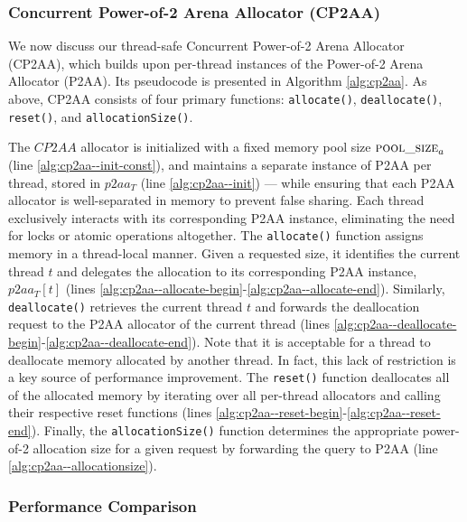 \subsubsection{Concurrent Power-of-2 Arena Allocator (CP2AA)}
\label{sec:cp2aa}

We now discuss our thread-safe Concurrent Power-of-2 Arena Allocator (CP2AA), which builds upon per-thread instances of the Power-of-2 Arena Allocator (P2AA). Its pseudocode is presented in Algorithm \ref{alg:cp2aa}. As above, CP2AA consists of four primary functions: \texttt{allocate()}, \texttt{deallocate()}, \texttt{reset()}, and \texttt{allocationSize()}.



The $CP2AA$ allocator is initialized with a fixed memory pool size $\textsc{pool\_size}_a$ (line \ref{alg:cp2aa--init-const}), and maintains a separate instance of P2AA per thread, stored in $p2aa_T$ (line \ref{alg:cp2aa--init}) --- while ensuring that each P2AA allocator is well-separated in memory to prevent false sharing. Each thread exclusively interacts with its corresponding P2AA instance, eliminating the need for locks or atomic operations altogether. The \texttt{allocate()} function assigns memory in a thread-local manner. Given a requested size, it identifies the current thread $t$ and delegates the allocation to its corresponding P2AA instance, $p2aa_T[t]$ (lines \ref{alg:cp2aa--allocate-begin}-\ref{alg:cp2aa--allocate-end}). Similarly, \texttt{deallocate()} retrieves the current thread $t$ and forwards the deallocation request to the P2AA allocator of the current thread (lines \ref{alg:cp2aa--deallocate-begin}-\ref{alg:cp2aa--deallocate-end}). Note that it is acceptable for a thread to deallocate memory allocated by another thread. In fact, this lack of restriction is a key source of performance improvement. The \texttt{reset()} function deallocates all of the allocated memory by iterating over all per-thread allocators and calling their respective reset functions (lines \ref{alg:cp2aa--reset-begin}-\ref{alg:cp2aa--reset-end}). Finally, the \texttt{allocationSize()} function determines the appropriate power-of-2 allocation size for a given request by forwarding the query to P2AA (line \ref{alg:cp2aa--allocationsize}).



\subsubsection{Performance Comparison}

